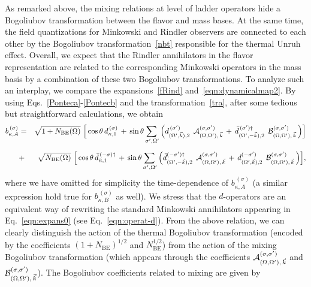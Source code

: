 \documentclass[floats,prd,aps,amssymb,nofootinbib,showkeys]{revtex4}
\def\bogocoeffAlpha{{\cal A}_{(\Om,\Om'),\,\vec{k}}^{(\si,\si')}}
\def\bogocoeffBeta{{\cal B}_{(\Om,\Om'),\,\vec{k}}^{(\si,\si')}}
\def\bogocoeffAlphamensigstarkapdue{{\cal A}_{(\Om,\Om'),\,\vec{k}}^{(\si,\si')}}
\def\bogocoeffBetamensigstarkapdue{{\cal B}_{(\Om,\Om'),\,\vec{k}}^{(\si,\si')}}
\begin{document}
As remarked above, 
the mixing relations at level of ladder operators
hide a Bogoliubov transformation 
between the flavor and mass bases. 
At the same time, the field quantizations 
for Minkowski and Rindler observers are connected
to each other by the Bogoliubov transformation~\eqref{nbt}
responsible for the thermal Unruh effect. Overall, 
we expect that the Rindler annihilators in the flavor
representation are related to the corresponding Minkowski 
operators in the mass basis by a combination of these 
two Bogoliubov transformations.  To analyze such an interplay, 
we compare the expansions~\eqref{fRind} and~\eqref{eqn:dynamicalmap2}. By using Eqs.~\eqref{Ponteca}-\eqref{Pontecb} and the transformation~\eqref{tra}, 
after some tedious but straightforward calculations, we obtain~\cite{Luciano}
\begin{eqnarray}
\label{eqn:bogtransfbis}
b_{\kappa,A}^{\,(\sigma)}&=&\sqrt{1+N_{\mathrm{BE}}(\Omega)}\,\,
\Big[\cos\theta\, d_{\kappa,1}^{\,(\sigma)}
\,+\,\sin\theta\hspace{-0.6mm}\sum_{\hspace{0.6mm}\sigma',\hspace{0.1mm}\Omega'}\Big(d_{(\Omega',\vec{k}),2}^{\,(\sigma')}\,\;\bogocoeffAlpha \,+\,\bar d_{(\Omega',-\vec{k}),2}^{\,(\sigma')\dagger}\,\;\bogocoeffBeta\,\Big)\Big]\\[2mm]
\nonumber
&+&\,\sqrt{N_{\mathrm{BE}}(\Omega)}\,\,\Big[\cos\theta\,\bar d_{\tilde\kappa,1}^{\,(-\sigma)\dagger}
\,+\,\sin\theta\hspace{-0.6mm}\sum_{\hspace{0.6mm}\sigma',\hspace{0.1mm}\Omega'}\Big(\bar d_{(\Omega',-\vec{k}),2}^{(-\sigma')\dagger}\,\;\bogocoeffAlphamensigstarkapdue\,+\,d_{(\Omega',\vec{k}),2}^{(-\sigma')}\,\;\bogocoeffBetamensigstarkapdue\,\Big)\Big],
\end{eqnarray}
where we have omitted for simplicity the time-dependence
of $b_{\kappa,A}^{\,(\sigma)}$ (a similar expression hold true 
for $b_{\kappa,B}^{\,(\sigma)}$ as well). 
We stress that the $d$-operators
are an equivalent way of rewriting the standard 
Minkowski annihilators appearing in Eq.~\eqref{eqn:expans0} 
(see Eq.~\eqref{eqn:operat-d}).
From the above relation, we can clearly   
distinguish the action of the thermal
Bogoliubov transformation (encoded by the coefficients
${(1+N_{\mathrm{BE}})^{1/2}}$ and ${N^{1/2}_{\mathrm{BE}}}$) from the action of the mixing Bogoliubov transformation
(which appears through the coefficients $\bogocoeffAlpha$
and $\bogocoeffBeta$). The Bogoliubov coefficients related to mixing are given by~\cite{Luciano}
\end{document}
